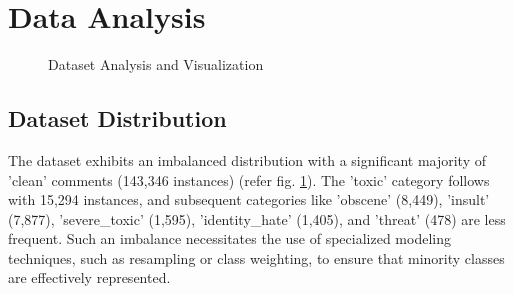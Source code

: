 \section{Data Analysis}

\begin{figure}%
    \centering
    \qquad
    \qquad
    \caption{Dataset Analysis and Visualization}%
    \label{fig:dataset_analysis}
\end{figure}


\subsection{Dataset Distribution}
The dataset exhibits an imbalanced distribution with a significant majority of 'clean' comments (143,346 instances) (refer fig. \ref{fig:dataset_analysis}). The 'toxic' category follows with 15,294 instances, and subsequent categories like 'obscene' (8,449), 'insult' (7,877), 'severe\_toxic' (1,595), 'identity\_hate' (1,405), and 'threat' (478) are less frequent. Such an imbalance necessitates the use of specialized modeling techniques, such as resampling or class weighting, to ensure that minority classes are effectively represented.

